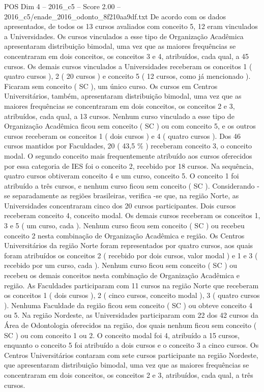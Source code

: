 \begin{textsample}{POS Dim 4 – 2016\_c5 – Score 2.00 – 2016\_c5/enade\_2016\_odonto\_8f210aa9df.txt}
De acordo com os dados apresentados, de todos os 13 cursos avaliados com conceito 5, 12 eram vinculados a Universidades.
Os cursos vinculados a esse tipo de Organização Acadêmica apresentaram distribuição bimodal, uma vez que as maiores frequências se concentraram em dois conceitos, os conceitos 3 e 4, atribuídos, cada qual, a 45 cursos.
Os demais cursos vinculados a Universidades receberam os conceitos 1 ( quatro cursos ), 2 ( 20 cursos ) e conceito 5 ( 12 cursos, como já mencionado ).
Ficaram sem conceito ( SC ), um único curso.
Os cursos em Centros Universitários, também, apresentaram distribuição bimodal, uma vez que as maiores frequências se concentraram em dois conceitos, os conceitos 2 e 3, atribuídos, cada qual, a 13 cursos.
Nenhum curso vinculado a esse tipo de Organização Acadêmica ficou sem conceito ( SC ) ou com conceito 5, e os outros cursos receberam os conceitos 1 ( dois cursos ) e 4 ( quatro cursos ).
Dos 46 cursos mantidos por Faculdades, 20 ( 43,5 \% ) receberam conceito 3, o conceito modal.
O segundo conceito mais frequentemente atribuído aos cursos oferecidos por essa categoria de IES foi o conceito 2, recebido por 18 cursos.
Na sequência, quatro cursos obtiveram conceito 4 e um curso, conceito 5.
O conceito 1 foi atribuído a três cursos, e nenhum curso ficou sem conceito ( SC ).
Considerando -se separadamente as regiões brasileiras, verifica -se que, na região Norte, as Universidades concentraram cinco dos 20 cursos participantes.
Dois cursos receberam conceito 4, conceito modal.
Os demais cursos receberam os conceitos 1, 3 e 5 ( um curso, cada ).
Nenhum curso ficou sem conceito ( SC ) ou recebeu conceito 2 nesta combinação de Organização Acadêmica e região.
Os Centros Universitários da região Norte foram representados por quatro cursos, aos quais foram atribuídos os conceitos 2 ( recebido por dois cursos, valor modal ) e 1 e 3 ( recebido por um curso, cada ).
Nenhum curso ficou sem conceito ( SC ) ou recebeu os demais conceitos nesta combinação de Organização Acadêmica e região.
As Faculdades participaram com 11 cursos na região Norte que receberam os conceitos 1 ( dois cursos ), 2 ( cinco cursos, conceito modal ), 3 ( quatro cursos ).
Nenhuma Faculdade da região ficou sem conceito ( SC ) ou obteve conceito 4 ou 5.
Na região Nordeste, as Universidades participaram com 22 dos 42 cursos da Área de Odontologia oferecidos na região, dos quais nenhum ficou sem conceito ( SC ) ou com conceito 1 ou 2.
O conceito modal foi 4, atribuído a 15 cursos, enquanto o conceito 5 foi atribuído a dois cursos e o conceito 3 a cinco cursos.
Os Centros Universitários contaram com sete cursos participante na região Nordeste, que apresentaram distribuição bimodal, uma vez que as maiores frequências se concentraram em dois conceitos, os conceitos 2 e 3, atribuídos, cada qual, a três cursos.

\end{textsample}
